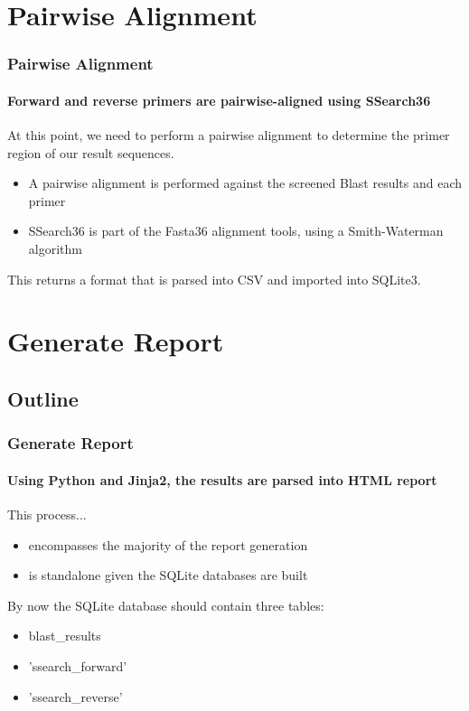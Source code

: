 \documentclass{beamer}
\newcommand{\sectiontitle}{}
\newcommand{\newsection}[1]{\renewcommand{\sectiontitle}{#1}\section{#1}}
\newcommand{\subsectiontitle}{}
\newcommand{\newsubsection}[1]{\renewcommand{\subsectiontitle}{#1}\subsection{#1}}
\begin{document}
  \newsection{Pairwise Alignment}
  \begin{frame}
    \frametitle{Pairwise Alignment}
    \framesubtitle{Forward and reverse primers are pairwise-aligned using SSearch36}
    
	At this point, we need to perform a pairwise alignment to determine the primer region of our result sequences.    
    
    \begin{itemize} \itemsep1em
    	  \item A pairwise alignment is performed against the screened Blast results and each primer
    	  \item SSearch36 is part of the Fasta36 alignment tools, using a Smith-Waterman algorithm
    \end{itemize}

	This returns a format that is parsed into CSV and imported into SQLite3.
    
  \end{frame}
  
  \newsection{Generate Report}
  \newsubsection{Outline}
  \begin{frame}
    \frametitle{Generate Report}
    \framesubtitle{Using Python and Jinja2, the results are parsed into HTML report}
    
	This process...
	
	\begin{itemize} \itemsep.5em
	  \item encompasses the majority of the report generation
	  \item is standalone given the SQLite databases are built  
	\end{itemize}
	
	By now the SQLite database should contain three tables:
	
	\begin{itemize} \itemsep.5em
	  \item blast\_results
	  \item 'ssearch\_forward'
	  \item 'ssearch\_reverse'
	\end{itemize}    
    
  \end{frame}
  
\end{document}
